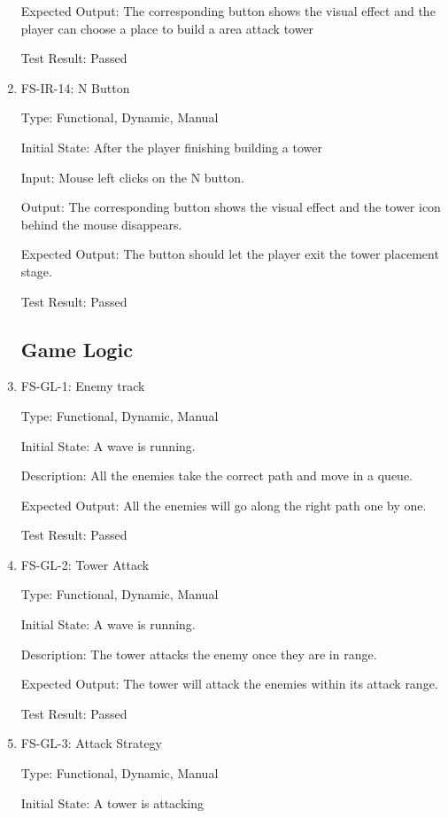 \documentclass[12pt]{article}
\begin{document}
\begin{enumerate}
	Expected Output: The corresponding button shows the visual effect and the player can choose a place to build a area attack tower
	
	Test Result: Passed
	
	
	\item{FS-IR-14: N Button}
					
	Type: Functional, Dynamic, Manual
					
	Initial State: After the player finishing building a tower
					
	Input: Mouse left clicks on the N button.
					
	Output: The corresponding button shows the visual effect and the tower icon behind the mouse disappears.
					
	Expected Output: The button should let the player exit the tower placement stage.
	
	Test Result: Passed
	
	
	\subsection{Game Logic}				
	
	\item{FS-GL-1: Enemy track}

	Type: Functional, Dynamic, Manual

	Initial State: A wave is running.
	
    Description: All the enemies take the correct path and move in a queue.
	
	Expected Output: All the enemies will go along the right path one by one.
	
	Test Result: Passed
	
	
	\item{FS-GL-2: Tower Attack}
					
	Type: Functional, Dynamic, Manual
					
    Initial State: A wave is running.
					
	Description: The tower attacks the enemy once they are in range.
					
	Expected Output: The tower will attack the enemies within its attack range.
	
	Test Result: Passed
	
					
	\item{FS-GL-3: Attack Strategy}
					
    Type: Functional, Dynamic, Manual
					
	Initial State: A tower is attacking
					

\end{enumerate}
\end{document}
